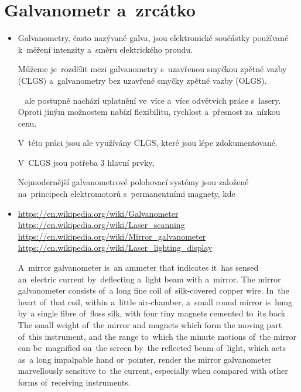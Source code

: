\section{Galvanometr a~zrcátko}
\begin{itemize}
  \item
        Galvanometry, často nazývané galva, jsou elektronické součástky používané k~měření intenzity a~směru elektrického proudu.~\cite{galvo}

        Můžeme je~rozdělit mezi galvanometry s~uzavřenou smyčkou zpětné vazby (CLGS) a~galvanometry bez uzavřené smyčky zpětné vazby (OLGS).~\cite{how-ls-work}

       ~\cite{advanced-galvo}
        ale postupně nachází uplatnění ve~více a~více odvětvích práce s~lasery.
        Oproti jiným možnostem nabízí flexibilitu, rychlost a~přesnost za~nízkou cenu.


        V~této práci jsou ale využívány CLGS, které jsou lépe zdokumentované.

        V~CLGS jsou potřeba 3 hlavní prvky, %

        Nejmodernější galvanometrové polohovací systémy jsou založené na~principech elektromotorů s~permanentními magnety, kde
       ~\cite{advanced-galvo}
  \item
        \url{https://en.wikipedia.org/wiki/Galvanometer}\\
        \url{https://en.wikipedia.org/wiki/Laser_scanning}\\
        \url{https://en.wikipedia.org/wiki/Mirror_galvanometer}\\
        \url{https://en.wikipedia.org/wiki/Laser_lighting_display}

        A~mirror galvanometer is~an ammeter that indicates it~has sensed an~electric current by~deflecting a~light beam with a~mirror.
        The mirror galvanometer consists of~a long fine coil of~silk-covered copper wire. %
        In~the heart of~that coil, within a~little air-chamber, a~small round mirror is~hung by~a single fibre of~floss silk, with four tiny magnets cemented to~its back
        The small weight of~the mirror and magnets which form the moving part of~this instrument, and the range to~which the minute motions of~the mirror can be~magnified on~the screen by~the reflected beam of~light, which acts as~a long impalpable hand or~pointer, render the mirror galvanometer marvellously sensitive to~the current, especially when compared with other forms of~receiving instruments.


\end{itemize}
